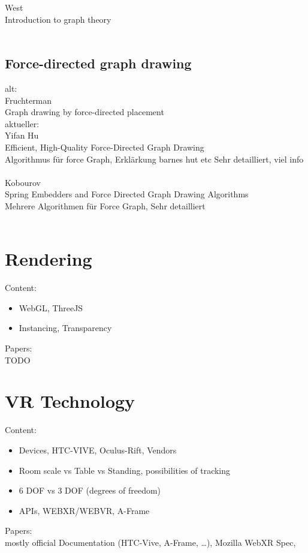 West\\
Introduction to graph theory\\
\\

\subsection{Force-directed graph drawing}
alt:\\
Fruchterman\\
Graph drawing by force-directed placement\\

aktueller:\\
Yifan Hu\\
Efficient, High-Quality Force-Directed Graph Drawing\\
Algorithmus für force Graph,  Erklärkung barnes hut etc Sehr detailliert, viel info\\
\\
Kobourov\\
Spring Embedders and Force Directed Graph Drawing Algorithms\\
Mehrere Algorithmen für Force Graph, Sehr detailliert\\
\\

\section{Rendering}

Content: 
\begin{itemize}
    \item WebGL, ThreeJS
    \item Instancing, Transparency
\end{itemize}

Papers:\\
TODO

\section{VR Technology}

Content:
\begin{itemize}
    \item Devices, HTC-VIVE, Oculus-Rift, Vendors
    \item Room scale vs Table vs Standing, possibilities of tracking
    \item 6 DOF vs 3 DOF (degrees of freedom)
    \item APIs, WEBXR/WEBVR, A-Frame 
\end{itemize}

Papers:\\
mostly official Documentation (HTC-Vive, A-Frame, \dots ), Mozilla WebXR Spec, 

